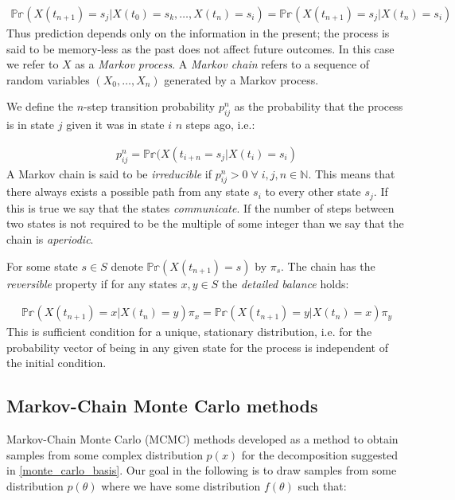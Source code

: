 \documentclass[11pt]{article} %
\begin{document}
\begin{align}
\mathbb{Pr}(X(t_{n+1}) = s_j | X(t_0) = s_k, \ldots, X(t_n) = s_i) = \mathbb{Pr}(X(t_{n+1}) = s_j | X(t_n) = s_i) 
\end{align}
Thus prediction depends only on the information in the present; the process is said to be memory-less as the past does not affect future outcomes. In this case we refer to $X$ as a \emph{Markov process}. A \emph{Markov chain} refers to a sequence of random variables $(X_0,\ldots,X_n)$ generated by a Markov process.

We define the $n$-step transition probability $p_{ij}^n$ as the probability that the process is in state $j$ given it was in state $i$ $n$ steps ago, i.e.:

\begin{align}
p_{ij}^n = \mathbb{Pr}(X(t_{i+n} = s_j | X(t_i) = s_i)
\end{align}
A Markov chain is said to be \emph{irreducible} if $p_{ij}^n > 0 \; \forall \; i,j,n \in \mathbb{N}$. This means that there always exists a possible path from any state $s_i$ to every other state $s_j$. If this is true we say that the states \emph{communicate}. If the number of steps between two states is not required to be the multiple of some integer than we say that the chain is \emph{aperiodic}.

For some state $s \in S$ denote $ \mathbb{Pr}(X(t_{n+1}) = s)$ by $\pi_s$. The chain has the \emph{reversible} property if for any states $x, y \in S$ the \emph{detailed balance} holds:

\begin{align}
 \mathbb{Pr}(X(t_{n+1}) = x | X(t_n) = y)  \pi_x  =  \mathbb{Pr}(X(t_{n+1}) = y | X(t_n) = x) \pi_y
\end{align}
This is sufficient condition for a unique, stationary distribution, i.e. for the probability vector of being in any given state for the process is independent of the initial condition.

\subsection{Markov-Chain Monte Carlo methods}
Markov-Chain Monte Carlo (MCMC) methods developed as a method to obtain samples from some complex distribution $p(x)$ for the decomposition suggested in \eqref{monte_carlo_basis}. Our goal in the following is to draw samples from some distribution $p(\theta)$ where we have some distribution $f(\theta)$ such that:
\end{document}
